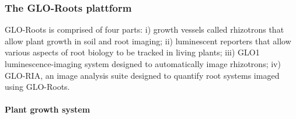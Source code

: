 \documentclass[]{article}
\begin{document}
\subsubsection{The GLO-Roots plattform}\label{the-glo-roots-plattform}

GLO-Roots is comprised of four parts: i) growth vessels called
rhizotrons that allow plant growth in soil and root imaging; ii)
luminescent reporters that allow various aspects of root biology to be
tracked in living plants; iii) GLO1 luminescence-imaging system designed
to automatically image rhizotrons; iv) GLO-RIA, an image analysis suite
designed to quantify root systems imaged using GLO-Roots.

\paragraph{Plant growth system}\label{plant-growth-system}
\end{document}
